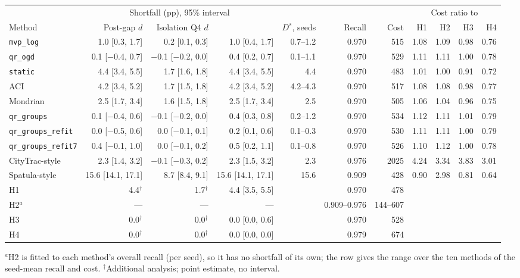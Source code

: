 \begin{tabular}{@{}lrrrrrrrrrr@{}}
\toprule
 & \multicolumn{3}{c}{Shortfall (pp), 95\% interval} & & & & \multicolumn{4}{c}{Cost ratio to} \\
\cmidrule(lr){2-4}\cmidrule(l){8-11}
Method & Post-gap $d$ & Isolation Q4 $d$ & \Dbar{} & $D^s$, seeds & Recall & Cost & H1 & H2 & H3 & H4 \\
\midrule
\texttt{mvp\_log} & 1.0 [0.3, 1.7] & 0.2 [0.1, 0.3] & 1.0 [0.4, 1.7] & 0.7--1.2 & 0.970 & 515 & 1.08 & 1.09 & 0.98 & 0.76 \\
\texttt{qr\_ogd} & 0.1 [$-$0.4, 0.7] & $-$0.1 [$-$0.2, 0.0] & 0.4 [0.2, 0.7] & 0.1--1.1 & 0.970 & 529 & 1.11 & 1.11 & 1.00 & 0.78 \\
\addlinespace
\texttt{static} & 4.4 [3.4, 5.5] & 1.7 [1.6, 1.8] & 4.4 [3.4, 5.5] & 4.4 & 0.970 & 483 & 1.01 & 1.00 & 0.91 & 0.72 \\
ACI & 4.2 [3.4, 5.2] & 1.7 [1.5, 1.8] & 4.2 [3.4, 5.2] & 4.2--4.3 & 0.970 & 517 & 1.08 & 1.08 & 0.98 & 0.77 \\
Mondrian & 2.5 [1.7, 3.4] & 1.6 [1.5, 1.8] & 2.5 [1.7, 3.4] & 2.5 & 0.970 & 505 & 1.06 & 1.04 & 0.96 & 0.75 \\
\texttt{qr\_groups} & 0.1 [$-$0.4, 0.6] & $-$0.1 [$-$0.2, 0.0] & 0.4 [0.3, 0.8] & 0.2--1.2 & 0.970 & 534 & 1.12 & 1.11 & 1.01 & 0.79 \\
\texttt{qr\_groups\_refit} & 0.0 [$-$0.5, 0.6] & 0.0 [$-$0.1, 0.1] & 0.2 [0.1, 0.6] & 0.1--0.3 & 0.970 & 530 & 1.11 & 1.11 & 1.00 & 0.79 \\
\texttt{qr\_groups\_refit7} & 0.4 [$-$0.1, 1.0] & 0.0 [$-$0.1, 0.2] & 0.5 [0.2, 1.1] & 0.1--0.8 & 0.970 & 526 & 1.10 & 1.12 & 1.00 & 0.78 \\
CityTrac-style & 2.3 [1.4, 3.2] & $-$0.1 [$-$0.3, 0.2] & 2.3 [1.5, 3.2] & 2.3 & 0.976 & 2025 & 4.24 & 3.34 & 3.83 & 3.01 \\
Spatula-style & 15.6 [14.1, 17.1] & 8.7 [8.4, 9.1] & 15.6 [14.1, 17.1] & 15.6 & 0.909 & 428 & 0.90 & 2.98 & 0.81 & 0.64 \\
\addlinespace
H1 & 4.4$^\dagger$ & 1.7$^\dagger$ & 4.4 [3.5, 5.5] & & 0.970 & 478 &  &  &  & \\
H2$^{a}$ & --- & --- & --- & & 0.909--0.976 & 144--607 &  &  &  & \\
H3 & 0.0$^\dagger$ & 0.0$^\dagger$ & 0.0 [0.0, 0.6] & & 0.970 & 528 &  &  &  & \\
H4 & 0.0$^\dagger$ & 0.0$^\dagger$ & 0.0 [0.0, 0.0] & & 0.979 & 674 &  &  &  & \\
\bottomrule
\end{tabular}

\smallskip\parbox{\textwidth}{\footnotesize $^{a}$H2 is fitted to each method's overall recall (per seed), so it has no shortfall of its own; the row gives the range over the ten methods of the seed-mean recall and cost. $^\dagger$Additional analysis; point estimate, no interval.}
